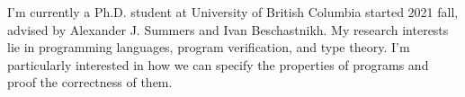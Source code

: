\documentclass[12pt,letterpaper]{report}
\newcommand{\listitemspace}{0.15em}
\renewenvironment{itemize}
{\begin{list}{}{\setlength{\leftmargin}{0em}
			\setlength{\parskip}{0em}
			\setlength{\itemsep}{\listitemspace}
			\setlength{\parsep}{\listitemspace}}}
	{\end{list}}
\begin{document}
\begin{itemize}



	\item I'm currently a Ph.D. student at University of British Columbia started 2021 fall, advised by Alexander J. Summers and Ivan Beschastnikh.
	      My research interests lie in programming languages, program verification, and type theory. I'm particularly interested in how we can specify the properties of programs and proof the correctness of them.

\end{itemize}

\end{document}

